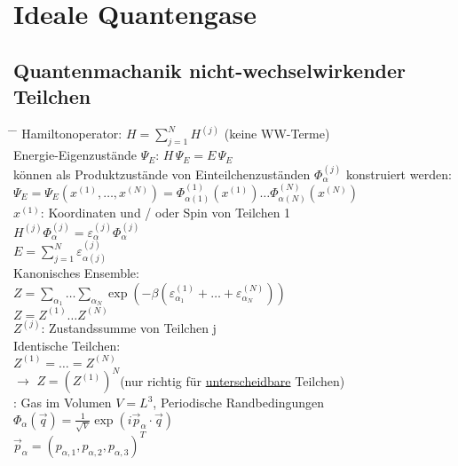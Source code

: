 \section{Ideale Quantengase}
\subsection{Quantenmachanik nicht-wechselwirkender Teilchen}
\setlength{\tabcolsep}{1pt}
\begin{tabbing}
\hspace{4em} \= \hspace{4em} \= \kill
Hamiltonoperator: \quad $H = \sum\limits_{j=1}^{N} H^{(j)}$ \quad (keine WW-Terme)\\
Energie-Eigenzustände $\Psi_E$: \quad $H \, \Psi_E = E \, \Psi_E$\\
können als Produktzustände von Einteilchenzuständen $\Phi_{\alpha}^{(j)}$ konstruiert werden:\\
\> $\Psi_E = \Psi_E\left(x^{(1)},\dots, x^{(N)}\right) = \Phi_{\alpha(1)}^{(1)}\left(x^{(1)}\right) \dots \Phi_{\alpha(N)}^{(N)}\left(x^{(N)}\right)$\\
\> $x^{(1)}$: Koordinaten und / oder Spin von Teilchen 1\\
\> $H^{(j)}\Phi_{\alpha}^{(j)} = \varepsilon_{\alpha}^{(j)} \Phi_{\alpha}^{(j)}$\\
\> $E = \sum\limits_{j=1}^{N} \varepsilon_{\alpha(j)}^{(j)}$\\
Kanonisches Ensemble:\\
\> $ Z = \sum\limits_{\alpha_1}\dots \sum\limits_{\alpha_N} \exp \left(-\beta \left(\varepsilon_{\alpha_1}^{(1)} + \dots + \varepsilon_{\alpha_N}^{(N)}\right)\right)$\\
\> $ Z = Z^{(1)} \dots Z^{(N)}$\\
\> $Z^{(j)}$: Zustandssumme von Teilchen j\\
Identische Teilchen:\\
\> $Z^{(1)} = \dots = Z^{(N)}$\\
$\rightarrow$ \> $Z = \left(Z^{(1)}\right)^N$\quad (nur richtig für \underline{unterscheidbare} Teilchen)\\
: Gas im Volumen $V= L^3$, Periodische Randbedingungen\\
\> $\Phi_{\alpha}\left(\vec{q}\right) = \frac{1}{\sqrt{V}} \exp \left(i \vec{p}_{\alpha}\cdot \vec{q}\right)$\\
\>$\vec{p}_{\alpha} = \left(p_{\alpha,1}, p_{\alpha,2}, p_{\alpha,3}\right)^T$\\

\end{tabbing}
